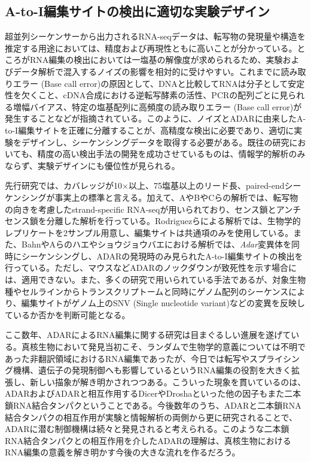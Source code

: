 \subsection{A-to-I編集サイトの検出に適切な実験デザイン}
超並列シーケンサーから出力されるRNA-seqデータは、転写物の発現量や構造を推定する用途においては、精度および再現性ともに高いことが分かっている。ところがRNA編集の検出においては一塩基の解像度が求められるため、実験およびデータ解析で混入するノイズの影響を相対的に受けやすい。これまでに読み取りエラー (Base call error)の原因として、DNAと比較してRNAは分子として安定性を欠くこと、cDNA合成における逆転写酵素の活性、PCRの配列ごとに見られる増幅バイアス、特定の塩基配列に高頻度の読み取りエラー (Base call error)が発生することなどが指摘されている。このように、ノイズとADARに由来したA-to-I編集サイトを正確に分離することが、高精度な検出に必要であり、適切に実験をデザインし、シーケンシングデータを取得する必要がある。既往の研究においても、精度の高い検出手法の開発を成功させているものは、情報学的解析のみならず、実験デザインにも優位性が見られる。
\par
先行研究では、カバレッジが10$\times$以上、75塩基以上のリード長、paired-endシーケンシングが事実上の標準と言える。加えて、AやBやCらの解析では、転写物の向きを考慮したstrand-specific RNA-seqが用いられており、センス鎖とアンチセンス鎖を分離した解析を行っている。Rodriguezらによる解析では、生物学的レプリケートを2サンプル用意し、編集サイトは共通項のみを使用している。また、BahnやAらのハエやショウジョウバエにおける解析では、\textit{Adar}変異体を同時にシーケンシングし、ADARの発現時のみ見られたA-to-I編集サイトの検出を行っている。ただし、マウスなどADARのノックダウンが致死性を示す場合には、適用できない。また、多くの研究で用いられている手法であるが、対象生物種やセルラインからトランスクリプトームと同時にゲノム配列のシーケンスにより、編集サイトがゲノム上のSNV (Single nucleotide variant)などの変異を反映しているか否かを判断可能となる。
\par
ここ数年、ADARによるRNA編集に関する研究は目まぐるしい進展を遂げている。真核生物において発見当初こそ、ランダムで生物学的意義については不明であった非翻訳領域におけるRNA編集であったが、今日では転写やスプライシング機構、遺伝子の発現制御へも影響しているというRNA編集の役割を大きく拡張し、新しい描象が解き明かされつつある。こういった現象を貫いているのは、ADARおよびADARと相互作用するDicerやDroshaといった他の因子もまた二本鎖RNA結合タンパクということである。今後数年のうち、ADARと二本鎖RNA結合タンパクの相互作用が実験と情報解析の両側から更に研究されることで、ADARに潜む制御機構は続々と発見されると考えられる。このような二本鎖RNA結合タンパクとの相互作用を介したADARの理解は、真核生物におけるRNA編集の意義を解き明かす今後の大きな流れを作るだろう。
